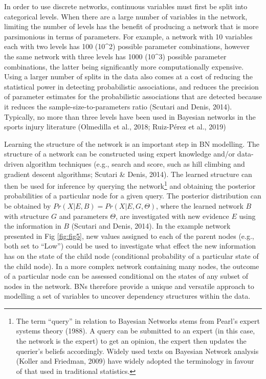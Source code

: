 \documentclass[
  english,
  man,floatsintext]{apa6}
\begin{document}
In order to use discrete networks, continuous variables must first be split into categorical levels.
When there are a large number of variables in the network, limiting the number of levels has the benefit of producing a network that is more parsimonious in terms of parameters. For example, a network with 10 variables each with two levels has 100 (10\^{}2) possible parameter combinations, however the same network with three levels has 1000 (10\^{}3) possible parameter combinations, the latter being significantly more computationally expensive. Using a larger number of splits in the data also comes at a cost of reducing the statistical power in detecting probabilistic associations, and reduces the precision of parameter estimates for the probabilistic associations that are detected because it reduces the sample-size-to-parameters ratio (Scutari and Denis, 2014). Typically, no more than three levels have been used in Bayesian networks in the sports injury literature (Olmedilla et al., 2018; Ruiz-Pérez et al., 2019)

Learning the structure of the network is an important step in BN modelling. The structure of a network can be constructed using expert knowledge and/or data-driven algorithm techniques (e.g., search and score, such as hill climbing and gradient descent algorithms; Scutari \& Denis, 2014).
The learned structure can then be used for inference by querying the network\footnote{The term ``query'' in relation to Bayesian Networks stems from Pearl's expert systems theory (1988). A query can be submitted to an expert (in this case, the network is the expert) to get an opinion, the expert then updates the querier's beliefs accordingly. Widely used texts on Bayesian Network analysis (Koller and Friedman, 2009) have widely adopted the terminology in favour of that used in traditional statistics.} and obtaining the posterior probabilities of a particular node for a given query.
The posterior distribution can be obtained by \(Pr(X|E,B) = Pr(X|E,G,\Theta)\), where the learned network \(B\) with structure \(G\) and parameters \(\Theta\), are investigated with new evidence \(E\) using the information in \(B\) (Scutari and Denis, 2014).
In the example network presented in Fig \ref{fig:fig5}, new values assigned to each of the parent nodes (e.g., both set to ``Low'') could be used to investigate what effect the new information has on the state of the child node (conditional probability of a particular state of the child node).
In a more complex network containing many nodes, the outcome of a particular node can be assessed conditional on the states of any subset of nodes in the network.
BNs therefore provide a unique and versatile approach to modelling a set of variables to uncover dependency structures within the data.
\end{document}
